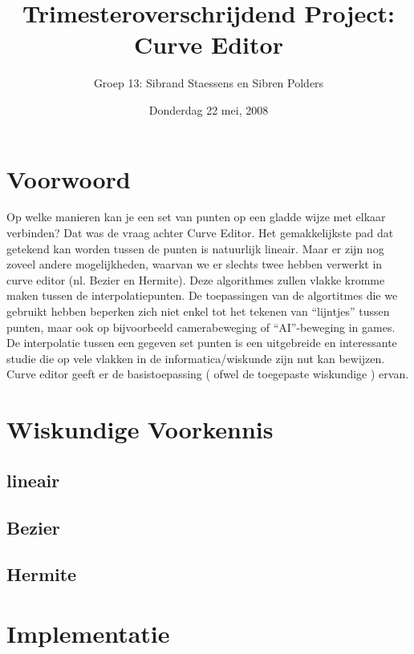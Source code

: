 \documentclass[a4paper,11pt,oneside, titlepage]{article}
\author{Groep 13: Sibrand Staessens en Sibren Polders}
\title{Trimesteroverschrijdend Project: Curve Editor}
\date{Donderdag 22 mei, 2008}
\begin{document}
\maketitle \newpage
\tableofcontents \newpage
\section{Voorwoord}
Op welke manieren kan je een set van punten op een gladde wijze met elkaar verbinden? Dat was
de vraag achter Curve Editor. Het gemakkelijkste pad dat getekend kan worden tussen de punten
is natuurlijk lineair. Maar er zijn nog zoveel andere mogelijkheden, waarvan we er
slechts twee hebben verwerkt in curve editor (nl. Bezier en Hermite). Deze algorithmes zullen
vlakke kromme maken tussen de interpolatiepunten. De toepassingen van de algortitmes die we 
gebruikt hebben beperken zich niet enkel tot het tekenen van ``lijntjes'' tussen punten, 
maar ook op bijvoorbeeld camerabeweging of ``AI''-beweging in games.
De interpolatie tussen een gegeven set punten is een uitgebreide en interessante studie die 
op vele vlakken in de informatica/wiskunde zijn nut kan bewijzen. Curve editor geeft er de 
basistoepassing ( ofwel de toegepaste wiskundige ) ervan. \newline \newline \newline \newline
\newline \newline \newline \newline
\newpage
\section{Wiskundige Voorkennis}
\subsection{lineair}
\subsection{Bezier}
\subsection{Hermite}
\newpage
\section{Implementatie}
\end{document}
